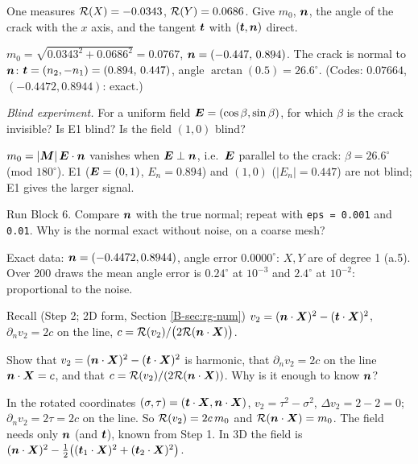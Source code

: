 \q One measures $\mathcal{R}(X)=-0.0343$, $\mathcal{R}(Y)=0.0686$. Give $m_0$, $\bm{n}$, the
angle of the crack with the $x$ axis, and the tangent $\bm{t}$ with $(\bm{t},\bm{n})$
direct.
\begin{answer}
$m_0=\sqrt{0.0343^2+0.0686^2}=0.0767$, $\bm{n}=(-0.447,\,0.894)$. The crack is
normal to $\bm{n}$: $\bm{t}=(n_2,-n_1)=(0.894,\,0.447)$, angle $\arctan(0.5)=
26.6^\circ$. (Codes: $0.07664$, $(-0.4472,0.8944)$: exact.)
\end{answer}

\q \emph{Blind experiment.} For a uniform field $\bm{E}=(\cos\beta,\sin\beta)$,
for which $\beta$ is the crack invisible? Is E1 blind? Is the field
$(1,0)$ blind?
\begin{answer}
$m_0=|\bm{M}|\,\bm{E}\cdot\bm{n}$ vanishes when $\bm{E}\perp\bm{n}$, i.e.\ $\bm{E}$ parallel to
the crack: $\beta=26.6^\circ$ (mod $180^\circ$). E1 ($\bm{E}=(0,1)$,
$E_n=0.894$) and $(1,0)$ ($|E_n|=0.447$) are not blind; E1 gives the
larger signal.
\end{answer}

\qc Run Block 6. Compare $\bm{n}$ with the true normal; repeat with
\texttt{eps = 0.001} and \texttt{0.01}. Why is the normal exact without
noise, on a coarse mesh?
\begin{answer}
Exact data: $\bm{n}=(-0.4472,0.8944)$, angle error $0.0000^\circ$: $X,Y$ are
of degree 1 (a.5). Over 200 draws the mean angle error is $0.24^\circ$ at
$10^{-3}$ and $2.4^\circ$ at $10^{-2}$: proportional to the noise.
\end{answer}

\begin{gbox}{Recall (Step 2; 2D form, Section \ref{B-sec:rg-num})}
$v_2=(\bm{n}\cdot\bm{X})^2-(\bm{t}\cdot\bm{X})^2$, $\partial_nv_2=2c$ on the line,
$c=\mathcal{R}(v_2)/\bigl(2\mathcal{R}(\bm{n}\cdot\bm{X})\bigr)$.
\end{gbox}

\q Show that $v_2=(\bm{n}\cdot\bm{X})^2-(\bm{t}\cdot\bm{X})^2$ is harmonic, that
$\partial_nv_2=2c$ on the line $\bm{n}\cdot\bm{X}=c$, and that
$c=\mathcal{R}(v_2)/(2\mathcal{R}(\bm{n}\cdot\bm{X}))$. Why is it enough to know $\bm{n}$?
\begin{answer}
In the rotated coordinates $(\sigma,\tau)=(\bm{t}\cdot\bm{X},\bm{n}\cdot\bm{X})$,
$v_2=\tau^2-\sigma^2$, $\Delta v_2=2-2=0$; $\partial_nv_2=2\tau=2c$ on the line.
So $\mathcal{R}(v_2)=2c\,m_0$ and $\mathcal{R}(\bm{n}\cdot\bm{X})=m_0$. The field needs only
$\bm{n}$ (and $\bm{t}$), known from Step 1. In 3D the field is
$(\bm{n}\cdot\bm{X})^2-\tfrac12\bigl((\bm{t}_1\cdot\bm{X})^2+(\bm{t}_2\cdot\bm{X})^2\bigr)$.
\end{answer}

